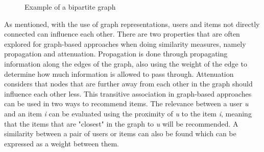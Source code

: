 \begin{figure}[h]
\caption{Example of a bipartite graph}
\label{fig:bipartite-graph}
\end{figure}

As mentioned, with the use of graph representations, users and items not directly connected can influence each other.
There are two properties that are often explored for graph-based approaches when doing similarity measures, namely propagation and attenuation.
Propagation is done through propagating information along the edges of the graph, also using the weight of the edge to determine how much information is allowed to pass through.
Attenuation considers that nodes that are further away from each other in the graph should influence each other less.
This transitive association in graph-based approaches can be used in two ways to recommend items.
The relevance between a user \textit{u} and an item \textit{i} can be evaluated using the proximity of \textit{u} to the item \textit{i}, meaning that the items that are "closest" in the graph to \textit{u} will be recommended.
A similarity between a pair of users or items can also be found which can be expressed as a weight between them\cite{RecommenderHandbook2015}.
